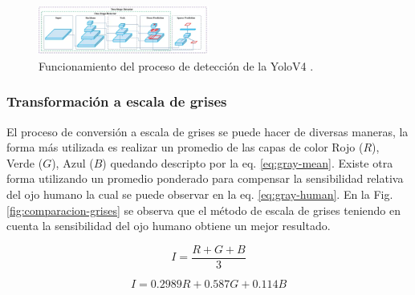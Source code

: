 \begin{figure}
    \centering
    \includegraphics[width=0.5\textwidth]{imgs/funcionamiento-yolo.png}
    \caption{Funcionamiento del proceso de detección de la YoloV4 \cite{bochkovskiy_yolov4_2020}.}
    \label{fig:funcionamiento-yolo}
\end{figure}

\subsubsection*{Transformación a escala de grises}

El proceso de conversión a escala de grises se puede hacer de diversas maneras, la forma más utilizada es realizar un promedio de las capas de color Rojo ($R$), Verde ($G$), Azul ($B$) quedando descripto por la eq. \ref{eq:gray-mean}. Existe otra forma utilizando un promedio ponderado para compensar la sensibilidad relativa del ojo humano la cual se puede observar en la eq. \ref{eq:gray-human}. En la Fig. \ref{fig:comparacion-grises} se observa que el método de escala de grises teniendo en cuenta la sensibilidad del ojo humano obtiene un mejor resultado.

\begin{equation}
    \label{eq:gray-mean}
    I = \frac{R + G + B}{3}
\end{equation}

\begin{equation}
    \label{eq:gray-human}
    I = 0.2989R + 0.587G + 0.114B
\end{equation}

